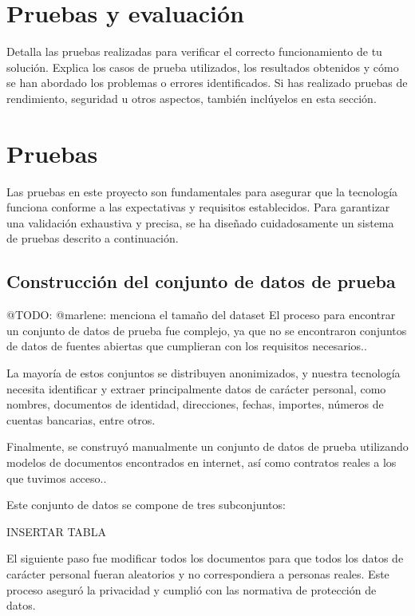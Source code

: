 \section{Pruebas y evaluación}

Detalla las pruebas realizadas para verificar el correcto funcionamiento de tu solución.
Explica los casos de prueba utilizados, los resultados obtenidos y cómo se han abordado los problemas o errores
identificados.
Si has realizado pruebas de rendimiento, seguridad u otros aspectos, también inclúyelos en esta sección.


\section{Pruebas}
Las pruebas en este proyecto son fundamentales para asegurar que la tecnología funciona conforme a las expectativas y
requisitos establecidos. Para garantizar una validación exhaustiva y precisa, se ha diseñado cuidadosamente un sistema
de pruebas descrito a continuación.

\subsection*{Construcción del conjunto de datos de prueba}

\colorbox{color_highlight}{@TODO: @marlene:} menciona el tamaño del dataset
El proceso para encontrar un conjunto de datos de prueba fue complejo, ya que no se encontraron conjuntos de datos de
fuentes abiertas que cumplieran con los requisitos necesarios..

La mayoría de estos conjuntos se distribuyen anonimizados, y nuestra tecnología necesita identificar y extraer
principalmente datos de carácter personal, como nombres, documentos de identidad, direcciones, fechas, importes, números
de cuentas bancarias, entre otros.

Finalmente, se construyó manualmente un conjunto de datos de prueba utilizando modelos de documentos encontrados en
internet, así como contratos reales a los que tuvimos acceso..

Este conjunto de datos se compone de tres subconjuntos:


INSERTAR TABLA

El siguiente paso fue modificar todos los documentos para que todos los datos de carácter personal fueran aleatorios y
no correspondiera a personas reales. Este proceso aseguró la privacidad y cumplió con las normativa de protección de
datos.

